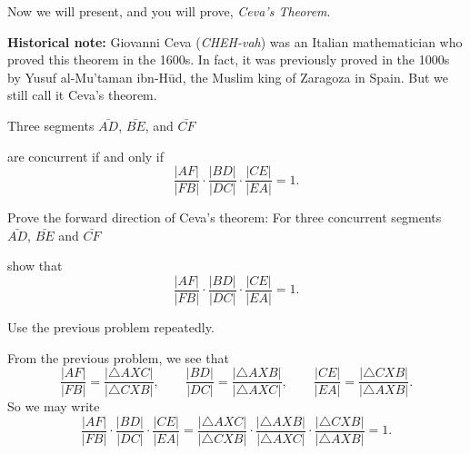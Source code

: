 \documentclass[newpage,hints,handout,nooutcomes,noauthor,12pt]{ximera}
\begin{document}
Now we will present, and you will prove, \textit{Ceva's Theorem}. %

\textbf{Historical note:} Giovanni Ceva (\emph{CHEH-vah}) was an Italian
mathematician who proved this theorem in the 1600s.  In fact, it was previously
proved in the 1000s by Yusuf al-Mu'taman ibn-H\=ud, the Muslim king of Zaragoza
in Spain.  But we still call it Ceva's theorem.

\begin{theorem}
Three segments $\bar{AD}$, $\bar{BE}$, and $\bar{CF}$
\begin{image}
\end{image}
are concurrent if and only if 
\[
\frac{|AF|}{|FB|}\cdot\frac{|BD|}{|DC|}\cdot\frac{|CE|}{|EA|}=1.
\]
\end{theorem}

\begin{problem}
Prove the forward direction of Ceva's theorem: For three concurrent
segments $\bar{AD}$, $\bar{BE}$ and $\bar{CF}$
\begin{image}
\end{image}
show that
\[
\frac{|AF|}{|FB|}\cdot\frac{|BD|}{|DC|}\cdot\frac{|CE|}{|EA|}=1.
\]
\begin{hint}
Use the previous problem repeatedly.
\end{hint}
\begin{freeResponse}
From the previous problem, we see that
\[
\frac{|AF|}{|FB|}=\frac{|\triangle AXC|}{|\triangle CXB|},\qquad
\frac{|BD|}{|DC|}=\frac{|\triangle AXB|}{|\triangle AXC|},\qquad
\frac{|CE|}{|EA|}=\frac{|\triangle CXB|}{|\triangle AXB|}.
\]
So we may write
\[
\frac{|AF|}{|FB|}\cdot\frac{|BD|}{|DC|}\cdot\frac{|CE|}{|EA|} = 
\frac{|\triangle AXC|}{|\triangle CXB|}\cdot 
\frac{|\triangle AXB|}{|\triangle AXC|}\cdot
\frac{|\triangle CXB|}{|\triangle AXB|} = 1.
\]
\end{freeResponse}
\end{problem}
\end{document}

